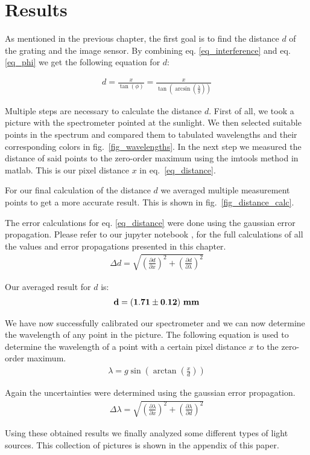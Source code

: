 \section{Results}\label{sec_results}

As mentioned in the previous chapter, the first goal is to find the distance $d$ of the grating
and the image sensor.
By combining eq. \ref{eq_interference} and eq. \ref{eq_phi} we get the following equation for $d$:

\begin{align}
    d = \frac{x}{\tan(\phi)} = \frac{x}{\tan(\arcsin(\frac{\lambda}{g}))} \label{eq_distance}
\end{align}

Multiple steps are necessary to calculate the distance $d$.
First of all, we took a picture with the spectrometer pointed at the sunlight. We then selected suitable 
points in the spectrum and compared them to tabulated wavelengths and their corresponding colors 
in fig.~\ref{fig_wavelengths}. In the next step we measured the distance of said points to the zero-order maximum
using the imtools method in matlab. This is our pixel distance $x$ in eq.~\ref{eq_distance}.

For our final calculation of the distance $d$ we averaged multiple measurement points to get a more
accurate result. This is shown in fig.~\ref{fig_distance_calc}.

The error calculations for eq. \ref{eq_distance} were done using the gaussian error propagation.
Please refer to our jupyter notebook \cite{GitHub}, for the full calculations of all the values and 
error propagations presented in this chapter. 
\begin{align}
    \Delta d = \sqrt{\left(\frac{\partial d}{\partial x}\right)^2 + \left(\frac{\partial d}{\partial \lambda}\right)^2}
\end{align}

Our averaged result for $d$ is:
\begin{align}
    \bf d = (1.71 \pm 0.12) ~\si{\bf\milli\meter} \label{res_d}
\end{align}

We have now successfully calibrated our spectrometer and we can now determine the wavelength
of any point in the picture.
The following equation is used to determine the wavelength of a point with a certain pixel 
distance $x$ to the zero-order maximum.
\begin{align}
    \lambda = g \sin\left(\arctan\left(\frac{x}{d}\right)\right) \label{eq_lambda}
\end{align}

Again the uncertainties were determined using the gaussian error propagation.
\begin{align}
    \Delta \lambda = \sqrt{\left(\frac{\partial \lambda}{\partial x}\right)^2 + \left(\frac{\partial \lambda}{\partial d}\right)^2}
\end{align}

Using these obtained results we finally analyzed some different types of light
sources. This collection of pictures is shown in the appendix of this paper.